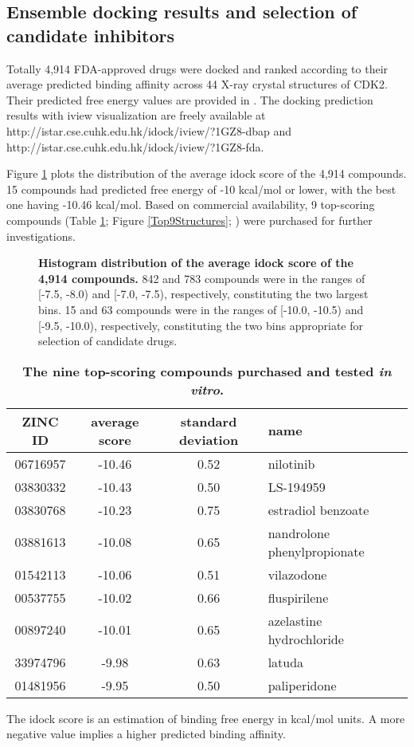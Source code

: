 \documentclass[10pt,letterpaper]{article}
\begin{document}
\subsection*{Ensemble docking results and selection of candidate inhibitors}

Totally 4,914 FDA-approved drugs were docked and ranked according to their average predicted binding affinity across 44 X-ray crystal structures of CDK2. Their predicted free energy values are provided in . The docking prediction results with iview visualization \cite{1366} are freely available at http://istar.cse.cuhk.edu.hk/idock/iview/?1GZ8-dbap and http://istar.cse.cuhk.edu.hk/idock/iview/?1GZ8-fda.

Figure \ref{AvgScoreHistogram} plots the distribution of the average idock score of the 4,914 compounds. 15 compounds had predicted free energy of -10 kcal/mol or lower, with the best one having -10.46 kcal/mol. Based on commercial availability, 9 top-scoring compounds (Table \ref{Top9}; Figure \ref{Top9Structures}; ) were purchased for further investigations.

\begin{figure}%
\caption{{\bf Histogram distribution of the average idock score of the 4,914 compounds.} 842 and 783 compounds were in the ranges of [-7.5, -8.0) and [-7.0, -7.5), respectively, constituting the two largest bins. 15 and 63 compounds were in the ranges of [-10.0, -10.5) and [-9.5, -10.0), respectively, constituting the two bins appropriate for selection of candidate drugs.}
\label{AvgScoreHistogram}
\end{figure}

\begin{table}
\caption{
\bf{The nine top-scoring compounds purchased and tested \textit{in vitro}.}}
\begin{tabular}{cccl}
\hline
ZINC ID & average score & standard deviation & name\\
\hline
06716957 & -10.46 & 0.52 & nilotinib\\
03830332 & -10.43 & 0.50 & LS-194959\\
03830768 & -10.23 & 0.75 & estradiol benzoate\\
03881613 & -10.08 & 0.65 & nandrolone phenylpropionate\\
01542113 & -10.06 & 0.51 & vilazodone\\
00537755 & -10.02 & 0.66 & fluspirilene\\
00897240 & -10.01 & 0.65 & azelastine hydrochloride\\
33974796 &  -9.98 & 0.63 & latuda\\
01481956 &  -9.95 & 0.50 & paliperidone\\
\hline
\end{tabular}
\begin{flushleft} The idock score is an estimation of binding free energy in kcal/mol units. A more negative value implies a higher predicted binding affinity.
\end{flushleft}
\label{Top9}
\end{table}
\end{document}
